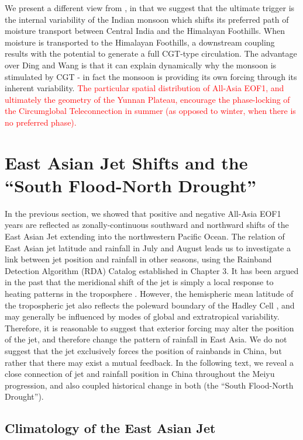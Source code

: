 	We present a different view from \citet{Ding2007}, in that we suggest that the ultimate trigger is the internal variability of the Indian monsoon which shifts its preferred path of moisture transport between Central India and the Himalayan Foothills. When moisture is transported to the Himalayan Foothills, a downstream coupling results with the potential to generate a full CGT-type circulation. The advantage over Ding and Wang is that it can explain dynamically why the monsoon is stimulated by CGT - in fact the monsoon is providing its own forcing through its inherent variability. \textcolor{red}{The particular spatial distribution of All-Asia EOF1, and ultimately the geometry of the Yunnan Plateau, encourage the phase-locking of the Circumglobal Teleconnection in summer (as opposed to winter, when there is no preferred phase).} 

\section{East Asian Jet Shifts and the ``South Flood-North Drought''}

	In the previous section, we showed that positive and negative All-Asia EOF1 years are reflected as zonally-continuous southward and northward shifts of the East Asian Jet extending into the northwestern Pacific Ocean. The relation of East Asian jet latitude and rainfall in July and August leads us to investigate a link between jet position and rainfall in other seasons, using the Rainband Detection Algorithm (RDA) Catalog established in Chapter 3. It has been argued in the past that the meridional shift of the jet is simply a local response to heating patterns in the troposphere \citep{Yu and Zhou}. However, the hemispheric mean latitude of the tropospheric jet also reflects the poleward boundary of the Hadley Cell \citep{Kang2015}, and may generally be influenced by modes of global and extratropical variability. Therefore, it is reasonable to suggest that exterior forcing may alter the position of the jet, and therefore change the pattern of rainfall in East Asia. We do not suggest that the jet exclusively forces the position of rainbands in China, but rather that there may exist a mutual feedback. In the following text, we reveal a close connection of jet and rainfall position in China throughout the Meiyu progression, and also coupled historical change in both (the ``South Flood-North Drought'').
	
\subsection{Climatology of the East Asian Jet}


